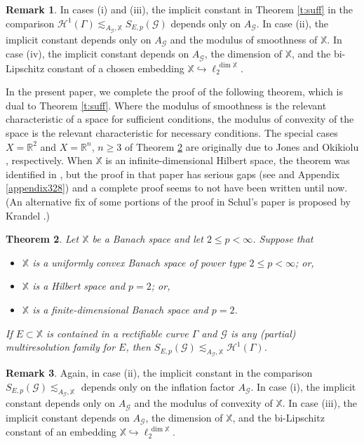 \documentclass[12pt]{amsart}
\numberwithin{equation}{section}
\theoremstyle{plain}
\newtheorem{theorem}{Theorem}[section]
\theoremstyle{definition}
\newtheorem{remark}[theorem]{Remark}
\def\RR{\mathbb{R}}
\def\XX{{\mathbb{X}}}
\newcommand{\Haus}{\mathcal{H}}
\numberwithin{figure}{section}
\begin{document}
\begin{remark} In cases (i) and (iii), the implicit constant in Theorem \ref{t:suff} in the comparison $\Haus^1(\Gamma)\lesssim_{A_\mathscr{G},\XX} S_{E,p}(\mathscr{G})$ depends only on $A_\mathscr{G}$. In case (ii), the implicit constant depends only on $A_\mathscr{G}$ and the modulus of smoothness of $\XX$. In case (iv), the implicit constant depends on $A_\mathscr{G}$, the dimension of $\XX$, and the bi-Lipschitz constant of a chosen embedding $\XX\hookrightarrow \ell_2^{\,\dim\XX}$.\end{remark}

In the present paper, we complete the proof of the following theorem, which is dual to Theorem \ref{t:suff}. Where the modulus of smoothness is the relevant characteristic of a space for sufficient conditions, the modulus of convexity of the space is the relevant characteristic for necessary conditions. The special cases $X=\RR^2$ and $X=\RR^n$, $n\geq 3$ of Theorem \ref{t:nec} are originally due to Jones \cite{Jones-TST} and Okikiolu \cite{Ok-TST}, respectively. When $\XX$ is an infinite-dimensional Hilbert space, the theorem was identified in \cite{Schul-Hilbert}, but the proof in that paper has serious gaps (see \cite[Remark 3.8]{Badger-McCurdy-1} and Appendix \ref{appendix328}) and a complete proof seems to not have been written until now. (An alternative fix of some portions of the proof in Schul's paper is proposed by Krandel \cite{Krandel-Hilbert}.)

\begin{theorem} \label{t:nec} Let $\XX$ be a Banach space and let $2\leq p<\infty$. Suppose that \begin{itemize}
\item[(i)] $\XX$ is a uniformly convex Banach space of power type $2\leq p<\infty$; or,
\item[(ii)] $\XX$ is a Hilbert space and $p=2$; or,
\item[(iii)] $\XX$ is a finite-dimensional Banach space and $p=2$.
\end{itemize} If $E\subset\XX$ is contained in a rectifiable curve $\Gamma$ and $\mathscr{G}$ is any (partial) multiresolution family for $E$, then $S_{E,p}(\mathscr{G})\lesssim_{A_{\mathscr{G}},\XX} \Haus^1(\Gamma)$.
\end{theorem}

\begin{remark} Again, in case (ii), the implicit constant in the comparison $S_{E,p}(\mathscr{G})\lesssim_{A_\mathscr{G},\XX}$ depends only on the inflation factor $A_\mathscr{G}$. In case (i), the implicit constant depends only on $A_\mathscr{G}$ and the modulus of convexity of $\XX$. In case (iii), the implicit constant depends on $A_\mathscr{G}$, the dimension of $\XX$, and the bi-Lipschitz constant of an embedding $\XX\hookrightarrow \ell_2^{\,\dim\XX}$.\end{remark}
\end{document}
